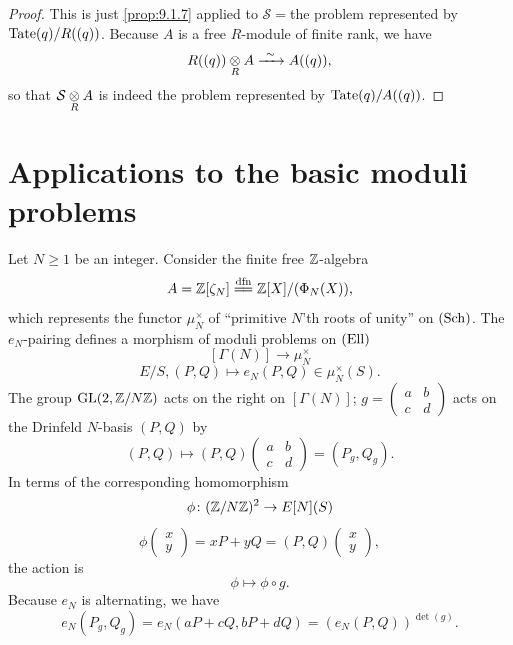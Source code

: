 \begin{proof}
This is just \eqref{prop:9.1.7} applied to $\mathcal{S} = {}$the problem represented by $\mathrm{Tate}(q)/R((q))$. Because $A$ is a free $R$-module of finite rank, we have
\[
R((q)) \underset{R}{\otimes} A \xrightarrow{\ \sim\ } A((q)) ,
\]
so that $\mathcal{S} \underset{R}{\otimes} A$ is indeed the problem represented by $\mathrm{Tate}(q)/A((q))$.
\end{proof}


\section{Applications to the basic moduli problems}
\label{sec:9.4}

\kmitem\label{item:9.4.1}
Let $N \ge 1$ be an integer. Consider the finite free $\mathbb{Z}$-algebra
\[
A = \Z[\zeta_N] \xlongequal{\mathrm{dfn}} \Z[X]/(\Phi_N(X)) ,
\]
which represents the functor $\mu_N^\times$ of ``primitive $N$'th roots of unity'' on $(\operatorname{Sch})$. The $e_N$-pairing defines a morphism of moduli problems on $(\mathrm{Ell})$
\[
[\Gamma(N)] \to \mu_N^\times
\]
\[
E/S, (P,Q) \mapsto e_N(P,Q) \in \mu_N^\times(S) .
\]
The group $\operatorname{GL}(2, \mathbb{Z}/N\mathbb{Z})$ acts on the right on $[\Gamma(N)]$; $g = \begin{pmatrix} a & b \\ c & d \end{pmatrix}$ acts on the Drinfeld $N$-basis $(P,Q)$ by
\[
(P,Q) \mapsto (P,Q)\begin{pmatrix} a & b \\ c & d \end{pmatrix} = (P_g, Q_g) .
\]
In terms of the corresponding homomorphism
\[
\phi \colon (\mathbb{Z}/N\mathbb{Z})^2 \to E[N](S)
\]
\[
\phi \begin{pmatrix} x \\ y \end{pmatrix} = xP + yQ = (P,Q)\begin{pmatrix} x \\ y \end{pmatrix} ,
\]
the action is
\[
\phi \mapsto \phi \circ g .
\]
Because $e_N$ is alternating, we have
\[
e_N(P_g, Q_g) = e_N(aP + cQ, bP + dQ) = (e_N(P,Q))^{\det(g)} .
\]

